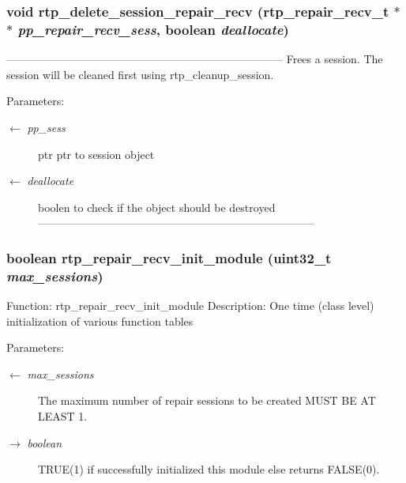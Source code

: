 \subsubsection{\setlength{\rightskip}{0pt plus 5cm}void rtp\_\-delete\_\-session\_\-repair\_\-recv (\bf{rtp\_\-repair\_\-recv\_\-t} $\ast$$\ast$ {\em pp\_\-repair\_\-recv\_\-sess}, boolean {\em deallocate})}\label{rtp__repair__recv_8h_03d375760a41a6fe50378bfdd533e0fb}


--------------------------------------------------------------------------- Frees a session. The session will be cleaned first using rtp\_\-cleanup\_\-session.

\begin{Desc}
\item[Parameters:]
\begin{description}
\item[\mbox{$\leftarrow$} {\em pp\_\-sess}]ptr ptr to session object \item[\mbox{$\leftarrow$} {\em deallocate}]boolen to check if the object should be destroyed --------------------------------------------------------------------------- \end{description}
\end{Desc}
\subsubsection{\setlength{\rightskip}{0pt plus 5cm}boolean rtp\_\-repair\_\-recv\_\-init\_\-module (uint32\_\-t {\em max\_\-sessions})}\label{rtp__repair__recv_8h_341a71fb87c931353f51e2a1d85c05fc}


Function: rtp\_\-repair\_\-recv\_\-init\_\-module Description: One time (class level) initialization of various function tables \begin{Desc}
\item[Parameters:]
\begin{description}
\item[\mbox{$\leftarrow$} {\em max\_\-sessions}]The maximum number of repair sessions to be created MUST BE AT LEAST 1. \item[\mbox{$\rightarrow$} {\em boolean}]TRUE(1) if successfully initialized this module else returns FALSE(0). \end{description}
\end{Desc}
